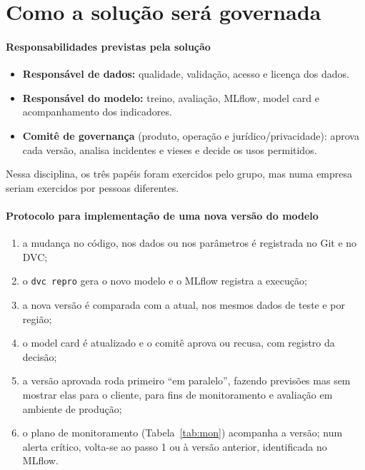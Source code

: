 \documentclass[11pt,a4paper]{article}
\begin{document}
\section{Como a solução será governada}
\label{sec:gov}

\paragraph{Responsabilidades previstas pela solução}
\begin{itemize}
  \item \textbf{Responsável de dados:} qualidade, validação, acesso e licença dos dados.
  \item \textbf{Responsável do modelo:} treino, avaliação, MLflow, model card e acompanhamento
        dos indicadores.
  \item \textbf{Comitê de governança} (produto, operação e jurídico/privacidade): aprova cada
        versão, analisa incidentes e vieses e decide os usos permitidos.
\end{itemize}
Nessa disciplina, os três papéis foram exercidos pelo grupo, mas numa empresa seriam
exercidos por pessoas diferentes.

\paragraph{Protocolo para implementação de uma nova versão do modelo}
\begin{enumerate}
  \item a mudança no código, nos dados ou nos parâmetros é registrada no Git e no DVC;
  \item o \texttt{dvc repro} gera o novo modelo e o MLflow registra a execução;
  \item a nova versão é comparada com a atual, nos mesmos dados de teste e por região;
  \item o model card é atualizado e o comitê aprova ou recusa, com registro da decisão;
  \item a versão aprovada roda primeiro ``em paralelo'', fazendo previsões mas sem mostrar elas
        para o cliente, para fins de monitoramento e avaliação em ambiente de produção;
  \item o plano de monitoramento (Tabela~\ref{tab:mon}) acompanha a versão; num alerta
        crítico, volta-se ao passo 1 ou à versão anterior, identificada no MLflow.
\end{enumerate}
\end{document}
